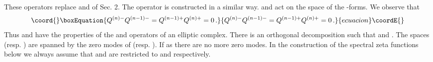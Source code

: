\documentclass[a4paper,12pt]{article}
\begin{document}
These operators replace \coordHE{} and \coordHE{}
of Sec. 2.
The operator \coordHE{} is constructed in a similar
way. \coordHE{} and \coordHE{} act on the space \coordHE{}
of the \coordHE{}-forms.
We observe that
\begin{equation}\coord{}\boxEquation{
Q^{(n)-}Q^{(n-1)-}=Q^{(n-1)+}Q^{(n)+}=0 \,.\label{QQ0}
}{
Q^{(n)-}Q^{(n-1)-}=Q^{(n-1)+}Q^{(n)+}=0 \,.}{ecuacion}\coordE{}\end{equation}
Thus \coordHE{} and \coordHE{} have the properties of the \coordHE{} and \myHighlight{$\delta$}\coordHE{}
operators of an elliptic complex.
There is an orthogonal decomposition \coordHE{} such that \coordHE{} and \coordHE{}. The spaces \coordHE{} (resp. 
\coordHE{}) are spanned by the zero modes of \coordHE{}
(resp. \coordHE{}). If \coordHE{} as \coordHE{}
there are no more zero modes. In the construction of the
spectral zeta functions below we always assume that \coordHE{}
and \coordHE{} are restricted to \coordHE{} and
\coordHE{} respectively. 
\end{document}
